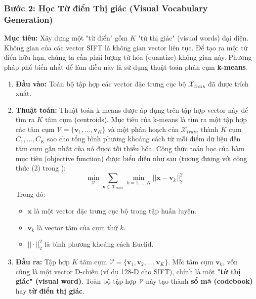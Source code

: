 \subsubsection{Bước 2: Học Từ điển Thị giác (Visual Vocabulary Generation)}
\label{subsubsec:bovw_codebook}
\textbf{Mục tiêu:} Xây dựng một "từ điển" gồm $K$ "từ thị giác" (visual words) đại diện. Không gian của các vector SIFT là không gian vector liên tục. Để tạo ra một từ điển hữu hạn, chúng ta cần phải lượng tử hóa (quantize) không gian này. Phương pháp phổ biến nhất để làm điều này là sử dụng thuật toán phân cụm \textbf{k-means}.

\begin{enumerate}
    \item \textbf{Đầu vào:} Toàn bộ tập hợp các vector đặc trưng cục bộ $\mathcal{X}_{train}$ đã được trích xuất.
    \item \textbf{Thuật toán:} Thuật toán k-means được áp dụng trên tập hợp vector này để tìm ra $K$ tâm cụm (centroids). Mục tiêu của k-means là tìm ra một tập hợp các tâm cụm $\mathcal{V} = \{\mathbf{v}_1, ..., \mathbf{v}_K\}$ và một phân hoạch của $\mathcal{X}_{train}$ thành $K$ cụm $C_1, ..., C_K$ sao cho tổng bình phương khoảng cách từ mỗi điểm dữ liệu đến tâm cụm gần nhất của nó được tối thiểu hóa. Công thức toán học của hàm mục tiêu (objective function) được biểu diễn như sau (tương đương với công thức (2) trong \cite{Gidaris2020}):
    \begin{equation}
        \underset{\mathcal{V}}{\operatorname{min}} \sum_{\mathbf{x} \in \mathcal{X}_{train}} \min_{k=1,...,K} ||\mathbf{x} - \mathbf{v}_k||_2^2
        \label{eq:kmeans_objective}
    \end{equation}
    Trong đó:
    \begin{itemize}
        \item $\mathbf{x}$ là một vector đặc trưng cục bộ trong tập huấn luyện.
        \item $\mathbf{v}_k$ là vector tâm của cụm thứ $k$.
        \item $||\cdot||_2^2$ là bình phương khoảng cách Euclid.
    \end{itemize}
    \item \textbf{Đầu ra:} Tập hợp $K$ tâm cụm $\mathcal{V} = \{\mathbf{v}_1, \mathbf{v}_2, ..., \mathbf{v}_K\}$. Mỗi tâm cụm $\mathbf{v}_k$, vốn cũng là một vector D-chiều (ví dụ 128-D cho SIFT), chính là một \textbf{"từ thị giác" (visual word)}. Toàn bộ tập hợp $\mathcal{V}$ này tạo thành \textbf{sổ mã (codebook)} hay \textbf{từ điển thị giác}.
\end{enumerate}


